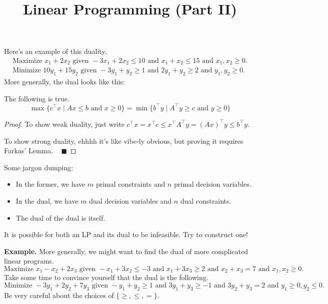\title{Linear Programming (Part II)}



Here's an example of this duality.
\begin{align*}
    \text{Maximize } x_1 + 2x_2 \text{ given } -3x_1 + 2x_2 \leq 10 \text{ and } x_1 + x_2 \leq 15 \text{ and } x_1, x_2 \geq 0. \\
    \text{Minimize } 10y_1 + 15y_2 \text{ given } -3y_1 + y_2 \geq 1 \text{ and } 2y_1 + y_2 \geq 2 \text{ and } y_1, y_2 \geq 0.
\end{align*}
More generally, the dual looks like this:

\begin{claim}
The following is true.
\[ \max\{ c^{\top} x \mid A x \leq b \text{ and } x \geq 0 \} = \min\{ b^{\top}y \mid A^{\top}y \geq c \text{ and } y \geq 0 \} \]
\end{claim} \vspace{-0.8cm}

\begin{proof}
    To show weak duality, just write $c^{\top}x = x^{\top}c \leq x^{\top}A^{\top}y = (Ax)^{\top}y \leq b^{\top}y$.

    To show strong duality, ehhhh it's like vibe-ly obvious, but proving it requires Farkas' Lemma. ~ $\blacksquare$
\end{proof}

Some jargon dumping:
\begin{itemize}
    \item In the former, we have $m$ primal constraints and $n$ primal decision variables.
    \item In the dual, we have $m$ dual decision variables and $n$ dual constraints. 
    \item The dual of the dual is itself.
\end{itemize}

\begin{remark}
    It is possible for both an LP and its dual to be infeasible.  Try to construct one!
\end{remark}

\textbf{Example.} More generally, we might want to find the dual of more complicated linear programs.
\[ \text{Maximize } x_1 - x_2 + 2x_3 \text{ given } -x_1 + 3x_2 \leq -3 \text{ and } x_1 + 3x_3 \geq 2 \text{ and } x_2 + x_3 = 7 \text{ and } x_1, x_2 \geq 0. \]
Take some time to convince yourself that the dual is the following.
\[ \text{Minimize } -3y_1 + 2y_2 + 7y_3 \text{ given } -y_1 + y_2 \geq 1 \text{ and } 3y_1 + y_3 \geq -1 \text{ and } 3y_2 + y_3 = 2 \text{ and } y_1 \geq 0, y_2 \leq 0. \]
Be very careful about the choices of $\{\geq, \leq, =\}$.

